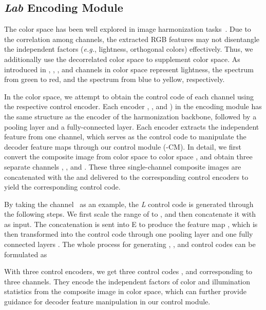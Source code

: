 \documentclass[sigconf]{acmart}
\begin{document}
\subsection{\textit{Lab} Encoding Module}\label{Color Style Encoder}

The  color space has been well explored in image harmonization tasks~\cite{dovenet, ssam, issam, intrinsic, IHT, rainnet, feature_mod, bargainnet, harmonizer, CDTNet}. Due to the correlation among  channels, the extracted RGB features may not disentangle the independent factors (\emph{e.g.}, lightness, orthogonal colors) effectively. 
Thus, we additionally use the decorrelated  color space to supplement  color space. 
As introduced in , , , and  channels in  color space represent lightness, the spectrum from green to red, and the spectrum from blue to yellow, respectively.

In the  color space, we attempt to obtain the control code of each channel using the respective control encoder. 
Each encoder , , and ) in the  encoding module has the same structure as the encoder of the harmonization backbone, followed by a pooling layer and a fully-connected layer. Each encoder extracts the independent feature from one channel, which serves as the control code to manipulate the decoder feature maps through our  control module (-CM).
In detail, we first convert the composite image from  color space  to  color space , and obtain three separate channels , , and . 
These three single-channel composite images are concatenated with the  and delivered to the corresponding control encoders to yield the corresponding control code.

By taking the  channel~ as an example, the \textit{L} control code  is generated through the following steps. 
We first scale the range of  to , and then concatenate it with  as input. The concatenation is sent into E to produce the feature map , which is then transformed into the  control code   through one pooling layer  and one fully connected layers .
The whole process for generating , , and  control codes can be formulated as


With three control encoders, we get three control codes , and  corresponding to three channels. 
They encode the independent factors of color and illumination statistics from the composite image in  color space, which can further provide guidance for decoder feature manipulation in our  control module.
\end{document}
